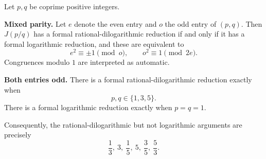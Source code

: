 \begin{theorem}\label{thm:classification}
Let $p,q$ be coprime positive integers.

\smallskip\noindent
\textbf{Mixed parity.} Let $e$ denote the even entry and $o$ the odd entry
of $(p,q)$. Then $J(p/q)$ has a formal rational-dilogarithmic reduction
if and only if it has a formal logarithmic reduction, and these are
equivalent to
\begin{equation}\label{eq:mixed-class}
 \boxed{\quad e^2\equiv\pm1\pmod o,
 \qquad o^2\equiv1\pmod{2e}.\quad}
\end{equation}
Congruences modulo $1$ are interpreted as automatic.

\smallskip\noindent
\textbf{Both entries odd.} There is a formal rational-dilogarithmic
reduction exactly when
\begin{equation}\label{eq:odd-class}
 p,q\in\{1,3,5\}.
\end{equation}
There is a formal logarithmic reduction exactly when $p=q=1$.

\smallskip\noindent
Consequently, the rational-dilogarithmic but not logarithmic arguments
are precisely
\begin{equation}\label{eq:six-extras}
 \boxed{\quad\frac13,\ 3,\ \frac15,\ 5,\ \frac35,\ \frac53.\quad}
\end{equation}
\end{theorem}

